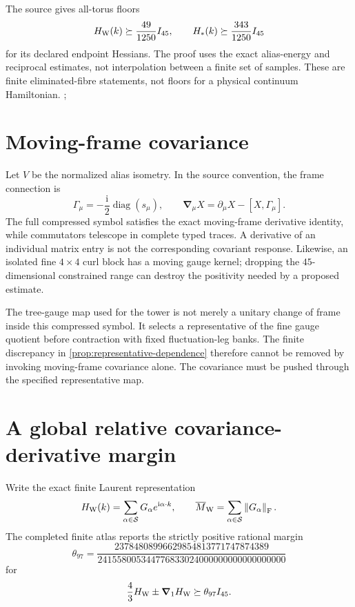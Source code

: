\documentclass[11pt,oneside,openany]{book}
\theoremstyle{definition}
\theoremstyle{remark}
\newcommand{\ii}{\mathrm i}
\newcommand{\diag}{\operatorname{diag}}
\newcommand{\norm}[1]{\left\lVert#1\right\rVert}
\newcommand{\src}[2]{\cite[#2]{#1}}
\begin{document}
The source gives all-torus floors
\begin{equation}\label{eq:finite-H-floor}
H_{\rm W}(k)\succeq\frac{49}{1250}I_{45},\qquad
H_*(k)\succeq\frac{343}{1250}I_{45}
\end{equation}
for its declared endpoint Hessians. The proof uses the exact alias-energy and reciprocal estimates, not interpolation between a finite set of samples. These are finite eliminated-fibre statements, not floors for a physical continuum Hamiltonian. \src{F9}{V63 and endpoint development}; \src{F10}{inherited oracle}

\section{Moving-frame covariance}
Let $V$ be the normalized alias isometry. In the source convention, the frame connection is
\[
\Gamma_\mu=-\frac{\ii}{2}\diag(s_\mu),\qquad
\boldsymbol\nabla_\mu X=\partial_\mu X-[X,\Gamma_\mu].
\]
The full compressed symbol satisfies the exact moving-frame derivative identity, while commutators telescope in complete typed traces. A derivative of an individual matrix entry is not the corresponding covariant response. Likewise, an isolated fine $4\times4$ curl block has a moving gauge kernel; dropping the $45$-dimensional constrained range can destroy the positivity needed by a proposed estimate.

The tree-gauge map used for the tower is not merely a unitary change of
frame inside this compressed symbol. It selects a representative of the
fine gauge quotient before contraction with fixed fluctuation-leg banks.
The finite discrepancy in \cref{prop:representative-dependence} therefore
cannot be removed by invoking moving-frame covariance alone. The
covariance must be pushed through the specified representative map.

\section{A global relative covariance-derivative margin}
Write the exact finite Laurent representation
\[
H_{\rm W}(k)=\sum_{\alpha\in\mathcal S}G_\alpha e^{\ii\alpha\cdot k},
\qquad \overline M_{\rm W}=\sum_{\alpha\in\mathcal S}\norm{G_\alpha}_{\rm F}.
\]
The completed finite atlas reports the strictly positive rational margin
\begin{equation}\label{eq:theta97}
\theta_{97}=
\frac{23784808996629854813771747874389}
{241558005344776833024000000000000000000}
\end{equation}
for
\begin{equation}\label{eq:relative-floor}
\frac43H_{\rm W}\pm\boldsymbol\nabla_1H_{\rm W}\succeq\theta_{97}I_{45}.
\end{equation}
\end{document}
